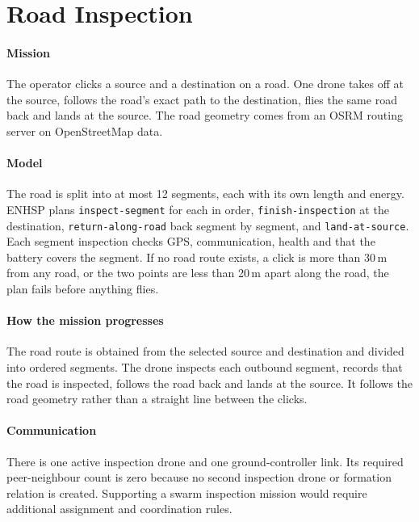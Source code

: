 \documentclass[11pt,a4paper,oneside]{report}
\newcommand{\code}[1]{\texttt{#1}}
\begin{document}
\section{Road Inspection}
\paragraph{Mission}
The operator clicks a source and a destination on a road. One drone takes off at the source,
follows the road's exact path to the destination, flies the same road back and lands at the
source. The road geometry comes from an OSRM routing server on OpenStreetMap
data.

\paragraph{Model}
The road is split into at most 12 segments, each with its own length and energy. ENHSP plans
\code{inspect-segment} for each in order, \code{finish-inspection} at the destination,
\code{return-along-road} back segment by segment, and \code{land-at-source}. Each segment
inspection checks GPS, communication, health and that the battery covers the segment. If no road
route exists, a click is more than 30\,m from any road, or the two points are less than 20\,m
apart along the road, the plan fails before anything flies.


\paragraph{How the mission progresses}
The road route is obtained from the selected source and destination and divided into ordered segments. The drone inspects each outbound segment, records that the road is inspected, follows the road back and lands at the source. It follows the road geometry rather than a straight line between the clicks.

\paragraph{Communication}
There is one active inspection drone and one ground-controller link. Its required peer-neighbour count is zero because no second inspection drone or formation relation is created. Supporting a swarm inspection mission would require additional assignment and coordination rules.
\end{document}
